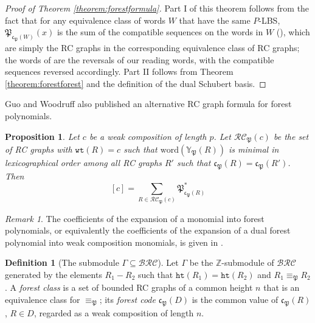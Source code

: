 \documentclass{amsart}
\newtheorem{proposition}[lemma]{Proposition}
\theoremstyle{definition}
\newtheorem{definition}[lemma]{Definition}
\theoremstyle{remark}
\newtheorem*{remark}{Remark}
\numberwithin{equation}{subsection}
\newcommand{\wtt}{\mathtt{wt}}
\newcommand{\hr}{\mathtt{ht}}
\newcommand{\BRC}{\mathcal{BRC}}
\newcommand{\RC}{\mathcal{RC}}
\newcommand{\code}{\mathfrak{c}}
\newcommand{\forest}{\mathfrak{P}}
\newcommand{\fcode}{\mathfrak{c}_\forest}
\begin{document}
\begin{proof}[Proof of Theorem \ref{theorem:forestformula}]
  Part I of this theorem follows from the fact that for any equivalence class of words $W$ that have the same $P$-LBS, $\forest_{\code_\forest(W)}(x)$ is the sum of the compatible sequences on the words in $W$ (\cite[Proposition~5.10]{nadeau2024forest}), which are simply the RC graphs in the corresponding equivalence class of RC graphs; the words of \cite{nadeau2024forest} are the reversals of our reading words, with the compatible sequences reversed accordingly. Part II follows from Theorem \ref{theorem:forestforest} and the definition of the dual Schubert basis.
\end{proof}

Guo and Woodruff \cite{guo2026forest} also published an alternative RC graph formula for forest polynomials.


\begin{proposition}
Let $c$ be a weak composition of length $p$. Let $\RC_\forest(c)$ be the set of RC graphs with $\wtt(R) = c$ such that $\mathrm{word}(\mathbb{Y}_\forest(R))$ is minimal in lexicographical order among all RC graphs $R'$ such that $\code_\forest(R)=\code_\forest(R')$. Then
$$[c] = \sum_{R\in\RC_\forest(c)} \forest_{\code_\forest(R)}^*$$
\end{proposition}

\begin{remark}
The coefficients of the expansion of a monomial into forest polynomials, or equivalently the coefficients of the expansion of a dual forest polynomial into weak composition monomials, is given in \cite[Proposition~10.15]{nadeau2024forest}.
\end{remark}

\begin{definition}[The submodule $\Gamma\subseteq \BRC$]\label{definition:gamma}
  Let $\Gamma$ be the $\mathbb{Z}$-submodule of $\BRC$ generated by the elements $R_1-R_2$ such that $\hr(R_1)=\hr(R_2)$ and $R_1\equiv_\forest R_2$. A \emph{forest class} is a set of bounded RC graphs of a common height $n$ that is an equivalence class for $\equiv_\forest$; its \emph{forest code} $\fcode(D)$ is the common value of $\fcode(R)$, $R\in D$, regarded as a weak composition of length $n$.
\end{definition}
\end{document}
